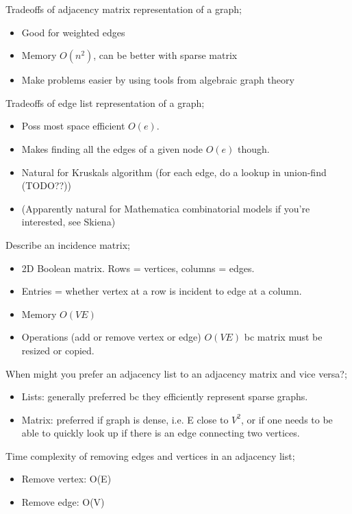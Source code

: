\documentclass{article}
\begin{document}
Tradeoffs of adjacency matrix representation of a graph; \begin{itemize} \item Good for weighted edges \item Memory $O(n^2)$, can be better with sparse matrix \item Make problems easier by using tools from algebraic graph theory \end{itemize}

Tradeoffs of edge list representation of a graph; \begin{itemize} \item Poss most space efficient $O(e)$.  \item Makes finding all the edges of a given node $O(e)$ though.  \item Natural for Kruskals algorithm (for each edge, do a lookup in union-find (TODO??)) \item (Apparently natural for Mathematica combinatorial models if you're interested, see Skiena) \end{itemize} 

Describe an incidence matrix; \begin{itemize} \item 2D Boolean matrix. Rows = vertices, columns = edges.  \item Entries = whether vertex at a row is incident to edge at a column.  \item Memory $O(VE)$ \item Operations (add or remove vertex or edge) $O(VE)$ bc matrix must be resized or copied.  \end{itemize} 

When might you prefer an adjacency list to an adjacency matrix and vice versa?; \begin{itemize} \item Lists: generally preferred bc they efficiently represent sparse graphs.  \item Matrix: preferred if graph is dense, i.e. E close to $V^2$, or if one needs to be able to quickly look up if there is an edge connecting two vertices.  \end{itemize} 
            
Time complexity of removing edges and vertices in an adjacency list; \begin{itemize} \item Remove vertex: O(E) \item Remove edge: O(V) \end{itemize} 
\end{document}

